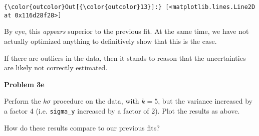 \documentclass[11pt]{article}
\begin{document}
    
\begin{Verbatim}[commandchars=\\\{\}]
{\color{outcolor}Out[{\color{outcolor}13}]:} [<matplotlib.lines.Line2D at 0x116d28f28>]
\end{Verbatim}
            
    By eye, this \emph{appears} superior to the previous fit. At the same
time, we have not actually optimized anything to definitively show that
this is the case.

If there are outliers in the data, then it stands to reason that the
uncertainties are likely not correctly estimated.

    \textbf{Problem 3e}

Perform the \(k\sigma\) procedure on the data, with \(k = 5\), but the
variance increased by a factor 4 (i.e. \texttt{sigma\_y} increased by a
factor of 2). Plot the results as above.

How do these results compare to our previous fits?
\end{document}

